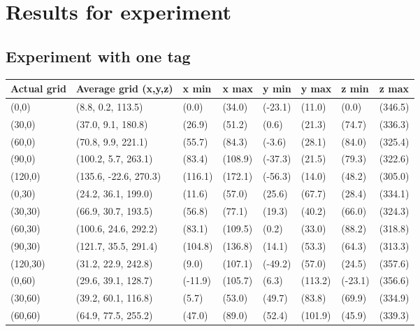 \section{Results for experiment}
\label{app:experiment}

\subsection{Experiment with one tag}
\label{app:one-tag}
\begin{table}[H]
    \begin{tabular}{|l|l|l|l|l|l|l|l|}
    \hline
    Actual grid & Average grid (x,y,z)  & x min   & x max   & y min    & y max   & z min   & z max    \\ \hline
    (0,0) 	& (8.8, 0.2, 113.5) 	 & (0.0) 	& (34.0)	& (-23.1)	 & (11.0) 	 & (0.0)	 & (346.5)	\\ \hline
    (30,0) 	& (37.0, 9.1, 180.8) 	 & (26.9) 	& (51.2)	& (0.6)	 & (21.3) 	 & (74.7)	 & (336.3)	\\ \hline
    (60,0) 	& (70.8, 9.9, 221.1) 	 & (55.7) 	& (84.3)	& (-3.6)	 & (28.1) 	 & (84.0)	 & (325.4)	\\ \hline
    (90,0) 	& (100.2, 5.7, 263.1) 	 & (83.4) 	& (108.9)	& (-37.3)	 & (21.5) 	 & (79.3)	 & (322.6)	\\ \hline
    (120,0) 	& (135.6, -22.6, 270.3) 	 & (116.1) 	& (172.1)	& (-56.3)	 & (14.0) 	 & (48.2)	 & (305.0)	\\ \hline
    (0,30) 	& (24.2, 36.1, 199.0) 	 & (11.6) 	& (57.0)	& (25.6)	 & (67.7) 	 & (28.4)	 & (334.1)	\\ \hline
    (30,30) 	& (66.9, 30.7, 193.5) 	 & (56.8) 	& (77.1)	& (19.3)	 & (40.2) 	 & (66.0)	 & (324.3)	\\ \hline
    (60,30) 	& (100.6, 24.6, 292.2) 	 & (83.1) 	& (109.5)	& (0.2)	 & (33.0) 	 & (88.2)	 & (318.8)	\\ \hline
    (90,30) 	& (121.7, 35.5, 291.4) 	 & (104.8) 	& (136.8)	& (14.1)	 & (53.3) 	 & (64.3)	 & (313.3)	\\ \hline
    (120,30) 	& (31.2, 22.9, 242.8) 	 & (9.0) 	& (107.1)	& (-49.2)	 & (57.0) 	 & (24.5)	 & (357.6)	\\ \hline
    (0,60) 	& (29.6, 39.1, 128.7) 	 & (-11.9) 	& (105.7)	& (6.3)	 & (113.2) 	 & (-23.1)	 & (356.6)	\\ \hline
    (30,60) 	& (39.2, 60.1, 116.8) 	 & (5.7) 	& (53.0)	& (49.7)	 & (83.8) 	 & (69.9)	 & (334.9)	\\ \hline
    (60,60) 	& (64.9, 77.5, 255.2) 	 & (47.0) 	& (89.0)	& (52.4)	 & (101.9) 	 & (45.9)	 & (339.3)	\\ \hline

\end{tabular}
\end{table}
